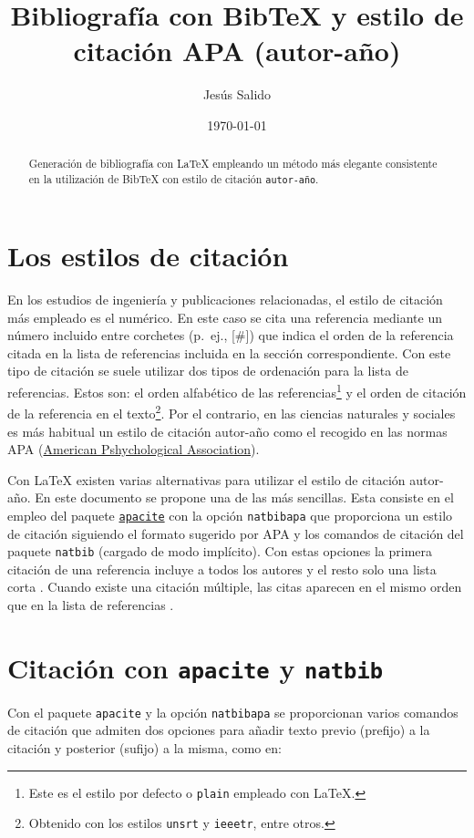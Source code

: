 \documentclass[11pt,a4paper]{article}
\author{Jesús Salido}
\title{Bibliografía con Bib\TeX{} y estilo de citación APA (autor-año)}
\date{\today}
\begin{document}
\maketitle


\begin{abstract}
Generación de bibliografía con \LaTeX{} empleando un método más elegante consistente en la utilización de Bib\TeX{} con estilo de citación \texttt{autor-año}.
\end{abstract}




\section{Los estilos de citación}
En los estudios de ingeniería y publicaciones relacionadas, el estilo de citación más empleado es el numérico. En este caso se cita una referencia mediante un número incluido entre corchetes (p.~ej., [\#]) que indica el orden de la referencia citada en la lista de referencias incluida en la sección correspondiente. Con este tipo de citación se suele utilizar dos tipos de ordenación para la lista de referencias. Estos son: el orden alfabético de las referencias\footnote{Este es el estilo por defecto o \texttt{plain} empleado con \LaTeX.} y el orden de citación de la referencia en el texto\footnote{Obtenido con los estilos \texttt{unsrt} y \texttt{ieeetr}, entre otros.}. Por el contrario, en las ciencias naturales y sociales es más habitual un estilo de citación autor-año como el recogido en las normas APA (\href{https://apastyle.apa.org/learn/faqs/format-bibliography}{American Pshychological Association}).

Con \LaTeX{} existen varias alternativas para utilizar el estilo de citación autor-año. En este documento se propone una de las más sencillas. Esta consiste en el empleo del paquete \href{https://ctan.javinator9889.com/biblio/bibtex/contrib/apacite/apacite.pdf}{\texttt{apacite}} con la opción \texttt{natbibapa} que proporciona un estilo de citación siguiendo el formato sugerido por APA y los comandos de citación del paquete \texttt{natbib} (cargado de modo implícito). Con estas opciones la primera citación de una referencia incluye a todos los autores \citep[como por ejemplo en][]{oetiker06} y el resto solo una lista corta \citep{oetiker06}. Cuando existe una citación múltiple, las citas aparecen en el mismo orden que en la lista de referencias \citep[como por ejemplo en][]{lamport94, cascales00,goos04,kopka04}.

\section{Citación con \texttt{apacite} y \texttt{natbib}}
Con el paquete \texttt{apacite} y la opción \texttt{natbibapa} se proporcionan varios comandos de citación que admiten dos opciones para añadir texto previo (prefijo) a la citación y posterior (sufijo) a la misma, como en:
\end{document}
